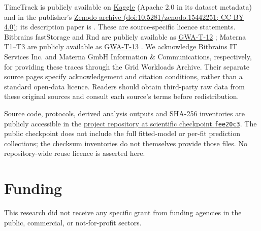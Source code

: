 \documentclass[a4paper,fleqn]{cas-dc}
\begin{document}
TimeTrack is publicly available on
\href{https://www.kaggle.com/datasets/abdelghanimeliani/open-air-interface-cicd-timeseries-dataset}{Kaggle}
(Apache 2.0 in its dataset metadata) and in the publisher's
\href{https://doi.org/10.5281/zenodo.15442251}{Zenodo archive
(doi:10.5281/zenodo.15442251; CC BY 4.0)}; its description paper is
\citet{Meliani2025TimeTrack}. These are source-specific licence statements.
Bitbrains fastStorage and Rnd are publicly available as
\href{https://atlarge-research.com/gwa-t-12/}{GWA-T-12}
\citep{Shen2015Bitbrains}; Materna T1--T3 are publicly available as
\href{https://atlarge-research.com/gwa-t-13/}{GWA-T-13}
\citep{Kohne2014FederatedCloudSim,Kohne2016SLAScheduling}.
We acknowledge Bitbrains IT Services Inc. and Materna GmbH Information
\& Communications, respectively, for providing these traces through the
Grid Workloads Archive. Their separate source pages specify acknowledgement
and citation conditions, rather than a standard open-data licence. Readers
should obtain third-party raw data from these original sources and consult
each source's terms before redistribution.

Source code, protocols, derived analysis outputs and SHA-256 inventories are
publicly accessible in the
\href{https://github.com/KADOUMAAbdelhak/TimeTrack-Forecasting-Framework/tree/fee20c316040c57b69ba12a193530c955b539771}{project repository at scientific checkpoint \texttt{fee20c3}}.
The public checkpoint does not include the full fitted-model or per-fit
prediction collections; the checksum inventories do not themselves provide
those files. No repository-wide reuse licence is asserted here.

\printcredits

\section*{Funding}

This research did not receive any specific grant from funding agencies in
the public, commercial, or not-for-profit sectors.




\end{document}
